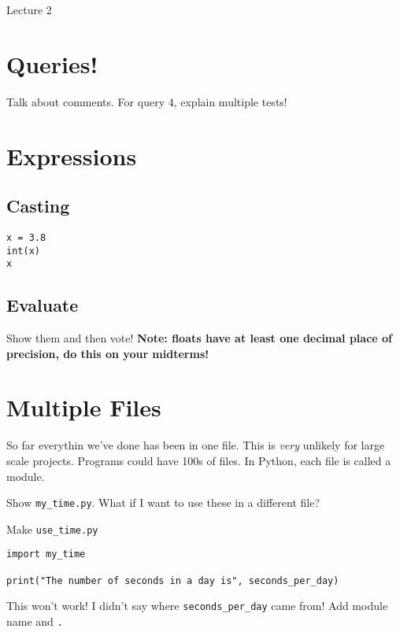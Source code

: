 \documentclass[12pt]{article}
\begin{document}
\begin{center}
   \LARGE Lecture 2
\end{center}

\setcounter{section}{-1}
\section{Queries!}

Talk about comments.  For query 4, explain multiple tests!

\section{Expressions}

\subsection{Casting}

\begin{lstlisting}
x = 3.8
int(x)
x
\end{lstlisting}

\subsection{Evaluate}

Show them and then vote!  \textbf{Note: floats have at least one decimal place
of precision, do this on your midterms!}

\section{Multiple Files}

So far everythin we've done has been in one file.  This is \emph{very} unlikely
for large scale projects.  Programs could have 100s of files.  In Python, each
file is called a module.

\noindent
Show \lstinline{my_time.py}.  What if I want to use these in a different file?

\noindent
Make \lstinline{use_time.py}

\begin{lstlisting}
import my_time

print("The number of seconds in a day is", seconds_per_day)
\end{lstlisting}

\noindent
This won't work!  I didn't say where \lstinline{seconds_per_day} came from!
Add module name and \lstinline{.}
\end{document}
